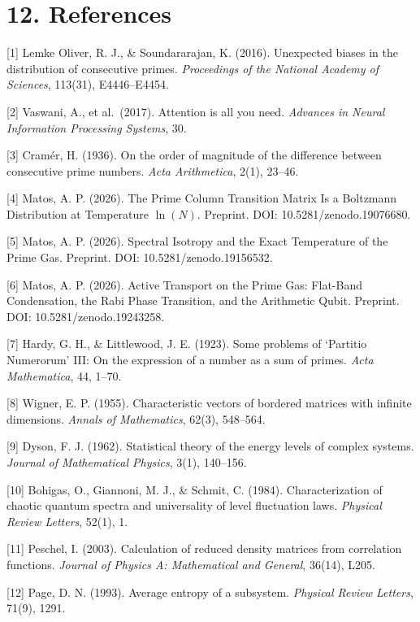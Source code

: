 \documentclass[
  11pt,
]{article}
\numberwithin{equation}{section}
\begin{document}
\setcounter{section}{12}\setcounter{equation}{0}
\setcounter{section}{12}\setcounter{equation}{0}
\section{12. References}\label{references}

{[}1{]} Lemke Oliver, R. J., \& Soundararajan, K. (2016). Unexpected
biases in the distribution of consecutive primes. \emph{Proceedings of
the National Academy of Sciences}, 113(31), E4446--E4454.

{[}2{]} Vaswani, A., et al.~(2017). Attention is all you need.
\emph{Advances in Neural Information Processing Systems}, 30.

{[}3{]} Cramér, H. (1936). On the order of magnitude of the difference
between consecutive prime numbers. \emph{Acta Arithmetica}, 2(1),
23--46.

{[}4{]} Matos, A. P. (2026). The Prime Column Transition Matrix Is a
Boltzmann Distribution at Temperature \(\ln(N)\). Preprint. DOI:
10.5281/zenodo.19076680.

{[}5{]} Matos, A. P. (2026). Spectral Isotropy and the Exact Temperature
of the Prime Gas. Preprint. DOI: 10.5281/zenodo.19156532.

{[}6{]} Matos, A. P. (2026). Active Transport on the Prime Gas:
Flat-Band Condensation, the Rabi Phase Transition, and the Arithmetic
Qubit. Preprint. DOI: 10.5281/zenodo.19243258.

{[}7{]} Hardy, G. H., \& Littlewood, J. E. (1923). Some problems of
`Partitio Numerorum' III: On the expression of a number as a sum of
primes. \emph{Acta Mathematica}, 44, 1--70.

{[}8{]} Wigner, E. P. (1955). Characteristic vectors of bordered
matrices with infinite dimensions. \emph{Annals of Mathematics}, 62(3),
548--564.

{[}9{]} Dyson, F. J. (1962). Statistical theory of the energy levels of
complex systems. \emph{Journal of Mathematical Physics}, 3(1), 140--156.

{[}10{]} Bohigas, O., Giannoni, M. J., \& Schmit, C. (1984).
Characterization of chaotic quantum spectra and universality of level
fluctuation laws. \emph{Physical Review Letters}, 52(1), 1.

{[}11{]} Peschel, I. (2003). Calculation of reduced density matrices
from correlation functions. \emph{Journal of Physics A: Mathematical and
General}, 36(14), L205.

{[}12{]} Page, D. N. (1993). Average entropy of a subsystem.
\emph{Physical Review Letters}, 71(9), 1291.
\end{document}
